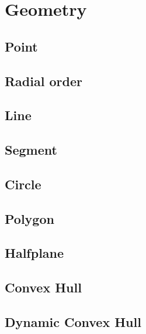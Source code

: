\newpage
\section{Geometry}

\subsection{Point}


\subsection{Radial order}


\subsection{Line}


\subsection{Segment}


\subsection{Circle}


\newpage
\subsection{Polygon}


\newpage
\subsection{Halfplane}


\newpage
\subsection{Convex Hull}

\subsection{Dynamic Convex Hull}

